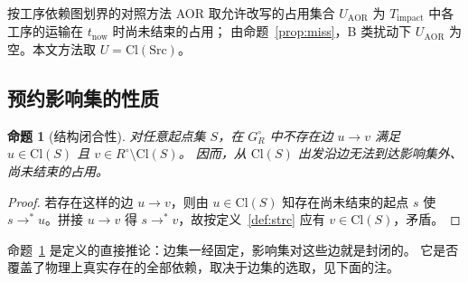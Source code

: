 \documentclass[manuscript,screen,review]{acmart}
\newtheorem{prop}{命题}
\begin{document}
按工序依赖图划界的对照方法 AOR 取允许改写的占用集合 \(U_{\mathrm{AOR}}\) 为 \(T_{\mathrm{impact}}\) 中各工序的运输在 \(t_{\mathrm{now}}\) 时尚未结束的占用；
由命题~\ref{prop:miss}，B 类扰动下 \(U_{\mathrm{AOR}}\) 为空。本文方法取 \(U=\mathrm{Cl}(\mathrm{Src})\)。

\subsection{预约影响集的性质}
\label{sec:containment}

\begin{prop}[结构闭合性]
\label{prop:struct}
对任意起点集 \(S\)，在 \(G_R^\circ\) 中不存在边
\(u\to v\) 满足 \(u\in\mathrm{Cl}(S)\) 且 \(v\in R^{\circ}\setminus\mathrm{Cl}(S)\)。
因而，从 \(\mathrm{Cl}(S)\) 出发沿边无法到达影响集外、尚未结束的占用。
\end{prop}

\begin{proof}
若存在这样的边 \(u\to v\)，则由 \(u\in\mathrm{Cl}(S)\) 知存在尚未结束的起点 \(s\) 使
\(s\to^* u\)。拼接 \(u\to v\) 得 \(s\to^* v\)，故按定义~\ref{def:strc} 应有
\(v\in\mathrm{Cl}(S)\)，矛盾。
\end{proof}

命题~\ref{prop:struct} 是定义的直接推论：边集一经固定，影响集对这些边就是封闭的。
它是否覆盖了物理上真实存在的全部依赖，取决于边集的选取，见下面的注。
\end{document}
